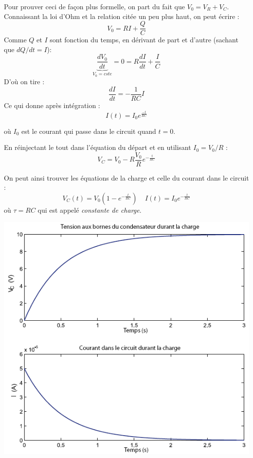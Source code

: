 \documentclass	[11pt, a4paper, openany]{book}
\begin{document}
		Pour prouver ceci de façon plus formelle, on part du fait que $V_0 = V_R + V_C$. Connaissant la loi d'Ohm et la relation citée un peu plus haut, on peut écrire :
		\begin{equation}
			V_0 = RI + \frac{Q}{C}
		\end{equation}
		Comme $Q$ et $I$ sont fonction du temps, en dérivant de part et d'autre (sachant que $dQ/dt = I$): 
		\begin{equation}
			\underbrace{\frac{dV_0}{dt}}_{V_0 = cste} = 0 = R\frac{dI}{dt} + \frac{I}{C}
		\end{equation}
		D'où on tire : 
		\begin{equation}
			\frac{dI}{dt} = - \frac{1}{RC}I
		\end{equation}
		Ce qui donne après intégration : 
		\begin{equation}
			I(t) = I_0e^{\frac{-t}{RC}}
		\end{equation}
		
		où $I_0$ est le courant qui passe dans le circuit quand $t = 0$.
		
		En réinjectant le tout dans l'équation du départ et en utilisant $I_0 = V_0/R$ :
		\begin{equation}
			V_C = V_0 - R\frac{V_0}{R}e^{-\frac{t}{RC}}
		\end{equation}
		
		On peut ainsi trouver les équations de la charge et celle du courant dans le circuit : 
		\begin{equation}
			V_C(t) = V_0\left(1-e^{-\frac{t}{RC}}\right)\ \ \ \ \ I(t) = I_0e^{-\frac{t}{RC}}
		\end{equation}
		où $\tau = RC$ qui est appelé \textit{constante de charge}.
		\begin{center}
			\includegraphics[scale=0.5]{labo/image14.png}
		\end{center}
		
\end{document}
